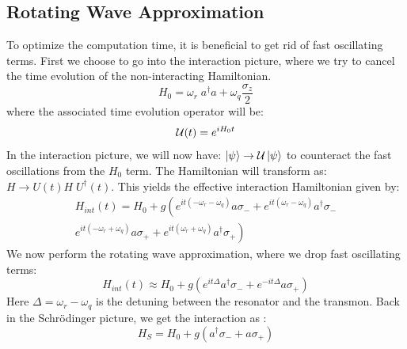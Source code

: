 \subsection{Rotating Wave Approximation}
To optimize the computation time, it is beneficial to get rid of fast oscillating terms. First we choose to go into the interaction picture, where we try to cancel the time evolution of the non-interacting Hamiltonian.
\begin{equation}
    H_0 = \omega_r \; a^\dagger a + \omega_q\frac{\sigma_z}{2} 
\end{equation}
where the associated time evolution operator will be:
\begin{equation}
    \mathcal{U}(t) = e^{iH_0t}
\end{equation}
In the interaction picture, we will now have: $\ket{\psi} \rightarrow \mathcal{U}\ket{\psi}$ to counteract the fast oscillations from the $H_0$ term. The Hamiltonian will transform as: $H \rightarrow U(t) H \; U^\dagger(t)$. This yields the effective interaction Hamiltonian given by:
\begin{align*}
    H_{int}(t) = H_0 + g \left(e^{it(-\omega_r - \omega_q)} a \sigma_- + e^{it(\omega_r - \omega_q)} a^\dagger \sigma_-\right.  \\ 
    \left.e^{it(-\omega_r + \omega_q)} a \sigma_+ + e^{it(\omega_r + \omega_q)} a^\dagger \sigma_+\right)
\end{align*}
We now perform the rotating wave approximation, where we drop fast oscillating terms:
\begin{equation}
    H_{int}(t) \approx H_0 + g \left(e^{it\Delta}a^\dagger\sigma_- +  e^{-it\Delta}a\sigma_+\right)
\end{equation}
Here $\Delta = \omega_r - \omega_q$ is the detuning between the resonator and the transmon. Back in the Schrödinger picture, we get the interaction as \cite{blais_circuit_2021}:
\begin{equation}
    H_{S} = H_0 + g \left(a^\dagger\sigma_- +  a\sigma_+\right)
\end{equation}

